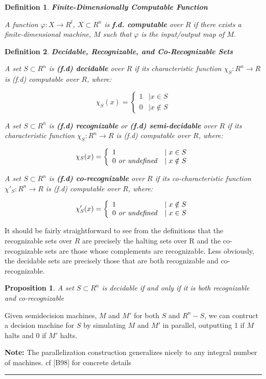 \documentclass[twoside]{article}
\newcommand{\twopartdef}[4]
{
  \left\{
    \begin{array}{ll}
      #1 & \mid #2 \\
      #3 & \mid #4
    \end{array}
  \right.
}
\newcommand{\functype}[3]{$#1:#2 \rightarrow #3$}
\newcommand{\note}[1]{{\textbf{Note:} #1}}
\renewcommand{\cite}[1]{[#1]}
\newtheorem{proposition}{Proposition}[section]
\newtheorem{definition}{Definition}[section]
\newenvironment{proofsketch}{{\bf Proof Sketch:}}{\hfill\rule{2mm}{2mm}}
\begin{document}
\begin{definition}{\textbf{Finite-Dimensionally Computable Function}}
  
  A function \functype{\varphi}{X}{R^l}, $X \subset R^n$ is
  \textbf{f.d. computable} over $R$ if there exists a
  finite-dimensional machine, $M$ such that $\varphi$ is the
  input/output map of $M$.
  
\end{definition}

\begin{definition}{\textbf{Decidable, Recognizable, and Co-Recognizable Sets}}
  
  A set $S \subset R^n$ is \textbf{(f.d) decidable} over $R$ if its
  characteristic function \functype{\chi_S}{R^n}{R} is (f.d)
  computable over $R$, where:
  
  $$\chi_S(x) =  \twopartdef{1}{x \in S}{0}{x \notin S}$$
  
  A set $S \subset R^n$ is \textbf{(f.d) recognizable} or
  \textbf{(f.d) semi-decidable} over $R$ if its characteristic
  function \functype{\chi_S}{R^n}{R} is (f.d) computable over $R$,
  where:
  
  $$\chi_S(x) =  \twopartdef{1}{x \in S}{0 \text{\emph{ or undefined}}}{x \notin S}$$
  
  A set $S \subset R^n$ is \textbf{(f.d) co-recognizable} over $R$
  if its co-characteristic function \functype{\chi'_S}{R^n}{R} is (f.d)
  computable over $R$, where:
  
  $$\chi'_S(x) =  \twopartdef{1}{x \notin S}{0 \text{\emph{ or undefined}}}{x \in S}$$
  
\end{definition}

  It should be fairly straightforward to see from the
  definitions that the recognizable sets over $R$ are precisely the
  halting sets over R and the co-recognizable sets are those whose
  complements are recognizable. Less obviously, the decidable sets
  are precisely those that are both recognizable and co-recognizable.

\begin{proposition}{A set $S \subset R^n$ is decidable if and only if it is
  both recognizable and co-recognizable}
\end{proposition}
\begin{proofsketch}
  
  Given semidecision machines, $M$ and $M'$ for both $S$ and $R^n -
  S$, we can contruct a decision machine for $S$ by simulating $M$ and
  $M'$ in parallel, outputting 1 if $M$ halts and 0 if $M'$ halts.  

  \note{The parallelization construction generalizes nicely to any
    integral number of machines. cf \cite{B98} for concrete details}

\end{proofsketch}
\end{document}
